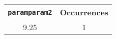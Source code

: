 \begin{longtable}{|c|c|}
\hline
\textbf{\texttt{paramparam2}} & \textbf{Occurrences} \\
\hline
9.25 & 1 \\
\hline
\end{longtable}